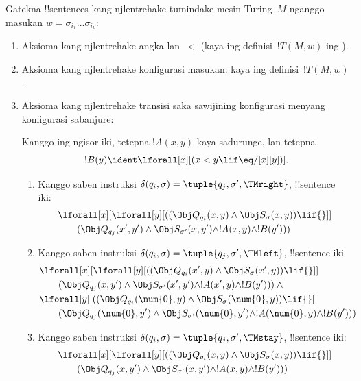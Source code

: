 \documentclass[../../../include/open-logic-section]{subfiles}
\begin{document}
Gatekna !!{sentence}s kang njlentrehake tumindake
mesin Turing~$M$ nganggo masukan
$w = \sigma_{i_1}\dots\sigma_{i_k}$:
\begin{enumerate}
\item Aksioma kang njlentrehake angka lan~$<$
  (kaya ing definisi~$!T(M,w)$ ing ).
\item Aksioma kang njlentrehake konfigurasi masukan:
  kaya ing definisi~$!T(M,w)$.
\item Aksioma kang njlentrehake transisi saka
  sawijining konfigurasi menyang konfigurasi sabanjure:

Kanggo ing ngisor iki, tetepna $!A(x, y)$ kaya
sadurunge, lan tetepna
\[
  !B(y) \ident \lforall[x][(x < y \lif \eq/[x][y])].
\]
\begin{enumerate}
\item {} Kanggo saben instruksi
  $\delta(q_i, \sigma) = \tuple{q_j, \sigma', \TMright}$,
  !!{sentence} iki:
\begin{align*}
& \lforall[x][\lforall[y][(
   (\Obj Q_{q_i}(x, y) \land \Obj S_{\sigma}(x, y)) \lif {}]] \\
&\qquad   (\Obj Q_{q_j}(x', y') \land \Obj S_{\sigma'}(x, y') \land
!A(x, y) \land !B(y')))
\end{align*}
\item {} Kanggo saben instruksi
  $\delta(q_i, \sigma) = \tuple{q_j, \sigma', \TMleft}$,
  !!{sentence} iki
\begin{align*}
& \lforall[x][\lforall[y][
    ((\Obj Q_{q_i}(x', y) \land \Obj S_{\sigma}(x', y)) \lif {}]]\\
& \qquad   (\Obj Q_{q_j}(x, y') \land \Obj S_{\sigma'}(x', y') \land
!A(x', y) \land !B(y'))) \land {}\\
& \lforall[y][((\Obj Q_{q_i}(\num{0}, y) \land \Obj S_{\sigma}(\num{0},
    y)) \lif {}]\\
& \qquad (\Obj Q_{q_j}(\num{0}, y') \land \Obj S_{\sigma'}(\num{0},
  y') \land !A(\num{0}, y) \land !B(y')))
\end{align*}
\item {} Kanggo saben instruksi
  $\delta(q_i, \sigma) = \tuple{q_j, \sigma', \TMstay}$,
  !!{sentence} iki:
\begin{align*}
& \lforall[x][\lforall[y][(
   (\Obj Q_{q_i}(x, y) \land \Obj S_{\sigma}(x, y)) \lif {}]] \\
&\qquad (\Obj Q_{q_j}(x, y') \land \Obj S_{\sigma'}(x, y') \land
!A(x, y) \land !B(y')))
\end{align*}

\end{enumerate}
\end{enumerate}
\end{document}
